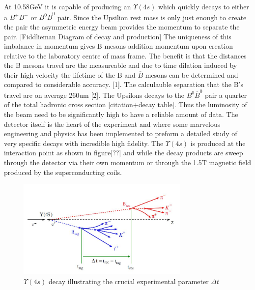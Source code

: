 At 10.58GeV it is capable of producing an $\Upsilon(4s)$ which quickly decays to either a $B^+B^-$ or $B^0\overline{B}^0$ pair. Since the Upsilion rest mass is only just enough to create the pair the asymmetric energy beam provides the momentum to separate the pair.
[Fiddlieman Diagram of decay and production]
The uniqueness of this imbalance in momentum gives B mesons addition momentum upon creation relative to the laboratory centre of mass frame. The benefit is that the distances the B mesons travel are the measureable and due to time dilation induced by their high velocity the lifetime of the B and $\overline{B}$ mesons can be determined and compared to considerable accuracy. [1]. The calculauble separation that the B’s travel are on average 260um [2]. The Upsilons decays to the $B^0 \overline{B}^0$ pair a quarter of  the total hadronic cross section [citation+decay table]. Thus the luminosity of the beam need to be significantly high to have a reliable amount of data.
The detector itself is the heart of the experiment and where some marvelous engineering and physics has been implemented to preform a detailed study of very specific decays with incredible high fidelity. The $\Upsilon(4s)$ is produced at the interaction point as shown in figure[??] and while the decay products are sweep through the detector via their own momentum or through the 1.5T magnetic field produced by the superconducting coils. 

\begin{figure}[h]
\centering
\includegraphics[width=0.75\textwidth]{figs/dt.JPG}
\caption{$\Upsilon (4s)$ decay illustrating the crucial experimental parameter $\Delta t$}
\label{BBD}
\end{figure}


